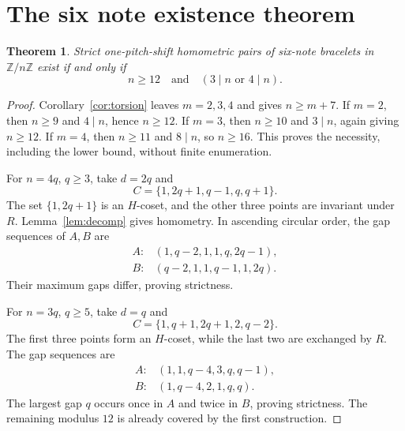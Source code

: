 \documentclass[11pt]{article}
\newtheorem{theorem}{Theorem}
\newcommand{\Z}{\mathbb Z}
\begin{document}
\section{The six note existence theorem}
\begin{theorem}\label{thm:existence}
Strict one-pitch-shift homometric pairs of six-note bracelets in $\Z/n\Z$ exist if and only if
\[
 n\ge12\quad\text{and}\quad (3\mid n\text{ or }4\mid n).
\]
\end{theorem}
\begin{proof}
Corollary~\ref{cor:torsion} leaves $m=2,3,4$ and gives $n\ge m+7$. If $m=2$, then $n\ge9$ and $4\mid n$, hence $n\ge12$. If $m=3$, then $n\ge10$ and $3\mid n$, again giving $n\ge12$. If $m=4$, then $n\ge11$ and $8\mid n$, so $n\ge16$. This proves the necessity, including the lower bound, without finite enumeration.

For $n=4q$, $q\ge3$, take $d=2q$ and
\[
 C=\{1,2q+1,q-1,q,q+1\}.
\]
The set $\{1,2q+1\}$ is an $H$-coset, and the other three points are invariant under $R$. Lemma~\ref{lem:decomp} gives homometry. In ascending circular order, the gap sequences of $A,B$ are
\[
\begin{array}{ll}
 A:&(1,q-2,1,1,q,2q-1),\\
 B:&(q-2,1,1,q-1,1,2q).
\end{array}
\]
Their maximum gaps differ, proving strictness.

For $n=3q$, $q\ge5$, take $d=q$ and
\[
 C=\{1,q+1,2q+1,2,q-2\}.
\]
The first three points form an $H$-coset, while the last two are exchanged by $R$. The gap sequences are
\[
\begin{array}{ll}
 A:&(1,1,q-4,3,q,q-1),\\
 B:&(1,q-4,2,1,q,q).
\end{array}
\]
The largest gap $q$ occurs once in $A$ and twice in $B$, proving strictness. The remaining modulus $12$ is already covered by the first construction.
\end{proof}
\end{document}

